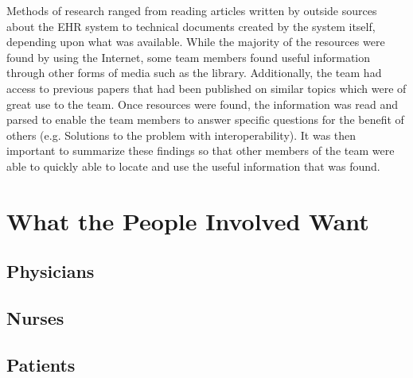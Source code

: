 \documentclass[14pt]{article}
\begin{document}
Methods of research ranged from reading articles written by outside sources about the \gls{EHR} system to technical documents created by the system itself, depending upon what was available.  While the majority of the resources were found by using the Internet, some team members found useful information through other forms of media such as the library.  Additionally, the team had access to previous papers that had been published on similar topics which were of great use to the team.  Once resources were found, the information was read and parsed to enable the team members to answer specific questions for the benefit of others (e.g. Solutions to the problem with interoperability).  It was then important to summarize these findings so that other members of the team were able to quickly able to locate and use the useful information that was found.


\newpage

\section{What the People Involved Want}
\label{sec:People}
\subsection{Physicians}
\subsection{Nurses}
\subsection{Patients}
\end{document}

